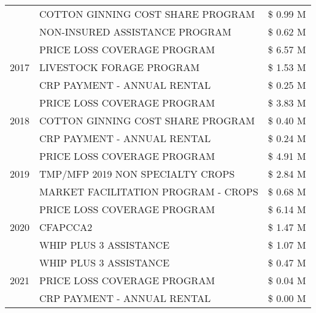 \begin{tabular}{llr}
 & COTTON GINNING COST SHARE PROGRAM             & \$ 0.99 M \\
 & NON-INSURED ASSISTANCE PROGRAM                & \$ 0.62 M \\
\cline{1-3}
\multirow[t]{3}{*}{2017} & PRICE LOSS COVERAGE PROGRAM & \$ 6.57 M \\
 & LIVESTOCK FORAGE PROGRAM & \$ 1.53 M \\
 & CRP PAYMENT - ANNUAL RENTAL & \$ 0.25 M \\
\cline{1-3}
\multirow[t]{3}{*}{2018} & PRICE LOSS COVERAGE PROGRAM & \$ 3.83 M \\
 & COTTON GINNING COST SHARE PROGRAM & \$ 0.40 M \\
 & CRP PAYMENT - ANNUAL RENTAL & \$ 0.24 M \\
\cline{1-3}
\multirow[t]{3}{*}{2019} & PRICE LOSS COVERAGE PROGRAM & \$ 4.91 M \\
 & TMP/MFP 2019 NON SPECIALTY CROPS & \$ 2.84 M \\
 & MARKET FACILITATION PROGRAM - CROPS & \$ 0.68 M \\
\cline{1-3}
\multirow[t]{3}{*}{2020} & PRICE LOSS COVERAGE PROGRAM & \$ 6.14 M \\
 & CFAPCCA2 & \$ 1.47 M \\
 & WHIP PLUS 3 ASSISTANCE & \$ 1.07 M \\
\cline{1-3}
\multirow[t]{3}{*}{2021} & WHIP PLUS 3 ASSISTANCE & \$ 0.47 M \\
 & PRICE LOSS COVERAGE PROGRAM & \$ 0.04 M \\
 & CRP PAYMENT - ANNUAL RENTAL & \$ 0.00 M \\
\cline{1-3}
\bottomrule
\end{tabular}
